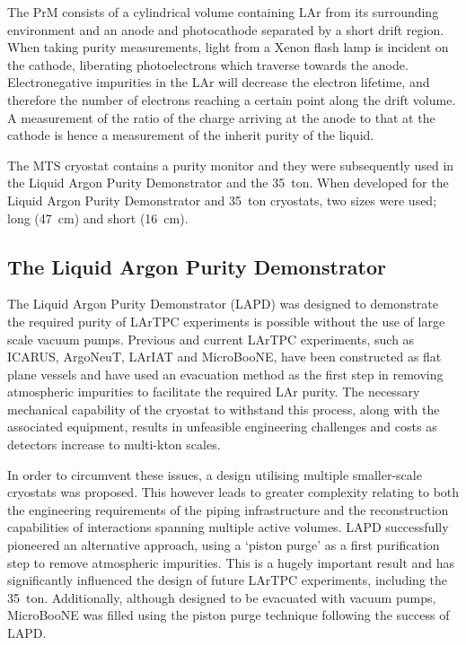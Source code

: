 The PrM consists of a cylindrical volume containing LAr from its surrounding environment and an anode and photocathode separated by a short drift region.  When taking purity measurements, light from a Xenon flash lamp is incident on the cathode, liberating photoelectrons which traverse towards the anode.  Electronegative impurities in the LAr will decrease the electron lifetime, and therefore the number of electrons reaching a certain point along the drift volume.  A measurement of the ratio of the charge arriving at the anode to that at the cathode is hence a measurement of the inherit purity of the liquid.

The MTS cryostat contains a purity monitor and they were subsequently used in the Liquid Argon Purity Demonstrator and the 35~ton.  When developed for the Liquid Argon Purity Demonstrator and 35~ton cryostats, two sizes were used; long (47~cm) and short (16~cm).

\subsection{The Liquid Argon Purity Demonstrator}\label{sec:LAPD}

The Liquid Argon Purity Demonstrator (LAPD) \cite{MTS2011,LAPD2014,LAPDJINST2014} was designed to demonstrate the required purity of LArTPC experiments is possible without the use of large scale vacuum pumps.  Previous and current LArTPC experiments, such as ICARUS, ArgoNeuT, LArIAT and MicroBooNE, have been constructed as flat plane vessels and have used an evacuation method as the first step in removing atmospheric impurities to facilitate the required LAr purity.  The necessary mechanical capability of the cryostat to withstand this process, along with the associated equipment, results in unfeasible engineering challenges and costs as detectors increase to multi-kton scales.

In order to circumvent these issues, a design utilising multiple smaller-scale cryostats was proposed.  This however leads to greater complexity relating to both the engineering requirements of the piping infrastructure and the reconstruction capabilities of interactions spanning multiple active volumes.  LAPD successfully pioneered an alternative approach, using a `piston purge' as a first purification step to remove atmospheric impurities.  This is a hugely important result and has significantly influenced the design of future LArTPC experiments, including the 35~ton.  Additionally, although designed to be evacuated with vacuum pumps, MicroBooNE was filled using the piston purge technique following the success of LAPD.

